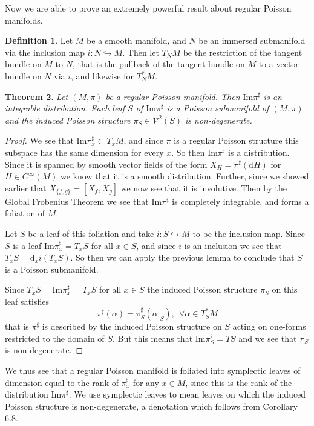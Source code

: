 \documentclass[psamsfonts,12pt]{amsart}
\newcommand\td{\mathrm{d}}
\newcommand\0{\mathbf{0}}
\theoremstyle{plain}
\newtheorem{thm}{Theorem}[section] %
\theoremstyle{definition}
\newtheorem{dfn}[thm]{Definition} %
\newcommand{\sV}{\mathcal{V}}
\begin{document}
Now we are able to prove an extremely powerful result about regular Poisson manifolds.

\begin{dfn}
Let $M$ be a smooth manifold, and $N$ be an immersed submanifold via the inclusion map $i\colon N\hookrightarrow M$.  Then let $T_NM$ be the restriction of the tangent bundle on $M$ to $N$, that is the pullback of the tangent bundle on $M$ to a vector bundle on $N$ via $i$, and likewise for $T^*_NM$.
\end{dfn}

\begin{thm}
Let $(M,\pi)$ be a regular Poisson manifold.  Then $\mathrm{Im}\pi^\sharp$ is an integrable distribution.  Each leaf $S$ of $\mathrm{Im} \pi^\sharp$ is a Poisson submanifold of $(M,\pi)$ and the induced Poisson structure $\pi_S \in \sV^2(S)$ is non-degenerate.
\end{thm}
\begin{proof}
We see that $\text{Im}\pi^\sharp_x \subset T_x M$, and since $\pi$ is a regular Poisson structure this subspace has the same dimension for every $x$.  So then $\text{Im}\pi^\sharp$ is a distribution.  Since it is spanned by smooth vector fields of the form $X_H=\pi^\sharp(\td H)$ for $H\in C^\infty(M)$ we know that it is a smooth distribution.  Further, since we showed earlier that $X_{\{f,g\}}=[X_f,X_g]$ we now see that it is involutive.  Then by the Global Frobenius Theorem we see that $\text{Im}\pi^\sharp$ is completely integrable, and forms a foliation of $M$.

Let $S$ be a leaf of this foliation and take $i\colon S\hookrightarrow M$ to be the inclusion map.  Since $S$ is a leaf $\text{Im}\pi^\sharp_x =T_x S$ for all $x\in S$, and since $i$ is an inclusion we see that $T_x S=\td_x i(T_x S)$.  So then we can apply the previous lemma to conclude that $S$ is a Poisson submanifold.

Since $T_xS=\text{Im}\pi^\sharp_x=T_xS$ for all $x\in S$ the induced Poisson structure $\pi_S$ on this leaf satisfies
\[
\pi^\sharp(\alpha)=\pi^\sharp_S(\alpha|_S), \ \ \forall \alpha \in T^*_SM
\]
that is $\pi^\sharp$ is described by the induced Poisson structure on $S$ acting on one-forms restricted to the domain of $S$.  But this means that $\text{Im}\pi^\sharp_S=TS$ and we see that $\pi_S$ is non-degenerate.
\end{proof}

We thus see that a regular Poisson manifold is foliated into symplectic leaves of dimension equal to the rank of $\pi^\sharp_x$ for any $x\in M$, since this is the rank of the distribution $\text{Im}\pi^\sharp$.  We use symplectic leaves to mean leaves on which the induced Poisson structure is non-degenerate, a denotation which follows from Corollary 6.8.
\end{document}
